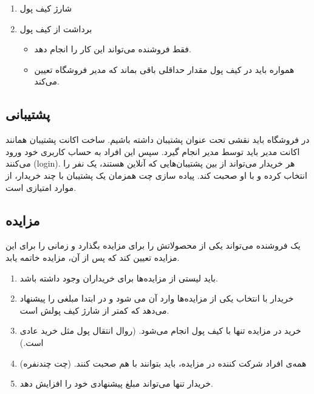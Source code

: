 \documentclass[]{article}
\begin{document}
\begin{enumerate}


\item
شارژ کیف پول

\item
برداشت از کیف پول

\begin{itemize}[label=$\blacksquare$]
\item
فقط فروشنده می‌تواند این کار را انجام دهد.

\item
همواره باید در کیف پول مقدار حداقلی باقی بماند که مدیر فروشگاه تعیین می‌کند.

\end{itemize}

\end{enumerate}


\subsection*{{\titr پشتیبانی}}

در فروشگاه باید نقشی تحت عنوان پشتیبان داشته باشیم. ساخت اکانت پشتیبان همانند اکانت \textcolor{CustomColor}{مدیر} باید توسط مدیر انجام گیرد. سپس این افراد به حساب کاربری خود ورود می‌کنند (‌login).  هر خریدار می‌تواند از بین پشتیبان‌هایی که آنلاین هستند، یک نفر را انتخاب کرده و با او صحبت کند. پیاده سازی چت همزمان یک پشتیبان با چند خریدار، از موارد امتیازی است.

\subsection*{{\titr مزایده}}

یک فروشنده می‌تواند یکی از محصولاتش را برای مزایده بگذارد و زمانی را برای این مزایده تعیین کند که پس از آن، مزایده خاتمه یابد. 

\begin{enumerate}

\item
باید لیستی از مزایده‌ها برای خریداران وجود داشته باشد.

\item
خریدار با انتخاب یکی از مزایده‌ها وارد آن می شود و در ابتدا مبلغی را پیشنهاد می‌دهد که کمتر از شارژ کیف پولش است.

\item
خرید در مزایده تنها با کیف پول انجام می‌شود. (روال انتقال پول مثل خرید عادی است.)

\item
همه‌ی افراد شرکت کننده در مزایده، باید بتوانند با هم صحبت کنند. (چت چندنفره)

\item
خریدار تنها می‌تواند مبلغ پیشنهادی خود را افزایش دهد.


\end{enumerate}
\end{document}
